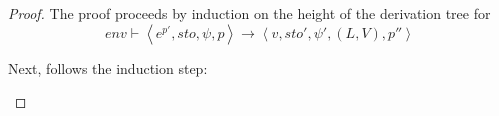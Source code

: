 \documentclass[../../../master.tex]{subfiles}
\begin{document}
\begin{proof}
	The proof proceeds by induction on the height of the derivation tree for 
	$$env\vdash\left\langle e^{p'},sto,\psi,p\right\rangle\rightarrow\left\langle v,sto',\psi',(L,V),p''\right\rangle$$
	\begin{description}
		
		
	\end{description}

	Next, follows the induction step:
	\begin{description}
		
		
		
		
		
		
		
		
		
		
	\end{description}
\end{proof}
\end{document}
